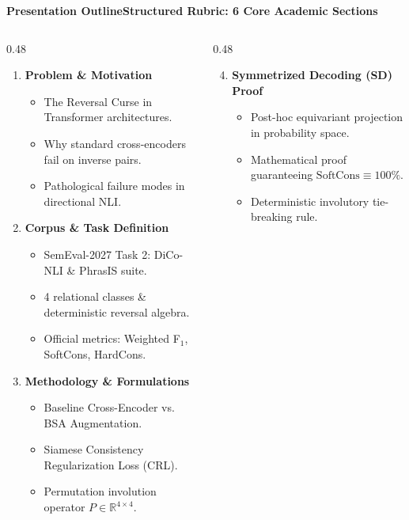 \documentclass[aspectratio=169,10pt]{beamer}
\begin{document}
\begin{frame}{\textbf{Presentation Outline}}{\textbf{Structured Rubric: 6 Core Academic Sections}}
  \begin{columns}[T]
    \begin{column}{0.48\textwidth}
      \begin{enumerate}
        \setlength{\itemsep}{6pt}
        \item \textbf{\color{UNAMNavy}Problem \& Motivation}
          \begin{itemize}\footnotesize\setlength{\itemsep}{1pt}
            \item The Reversal Curse in Transformer architectures.
            \item Why standard cross-encoders fail on inverse pairs.
            \item Pathological failure modes in directional NLI.
          \end{itemize}

        \item \textbf{\color{UNAMNavy}Corpus \& Task Definition}
          \begin{itemize}\footnotesize\setlength{\itemsep}{1pt}
            \item SemEval-2027 Task 2: DiCo-NLI \& PhrasIS suite.
            \item 4 relational classes \& deterministic reversal algebra.
            \item Official metrics: Weighted F$_1$, SoftCons, HardCons.
          \end{itemize}

        \item \textbf{\color{UNAMNavy}Methodology \& Formulations}
          \begin{itemize}\footnotesize\setlength{\itemsep}{1pt}
            \item Baseline Cross-Encoder vs. BSA Augmentation.
            \item Siamese Consistency Regularization Loss (CRL).
            \item Permutation involution operator $P \in \mathbb{R}^{4 \times 4}$.
          \end{itemize}
      \end{enumerate}
    \end{column}

    \begin{column}{0.48\textwidth}
      \begin{enumerate}
        \setcounter{enumi}{3}
        \setlength{\itemsep}{6pt}
        \item \textbf{\color{UNAMNavy}Symmetrized Decoding (SD) Proof}
          \begin{itemize}\footnotesize\setlength{\itemsep}{1pt}
            \item Post-hoc equivariant projection in probability space.
            \item Mathematical proof guaranteeing $\text{SoftCons} \equiv 100\%$.
            \item Deterministic involutory tie-breaking rule.
          \end{itemize}


\end{enumerate}
\end{column}
\end{columns}
\end{frame}
\end{document}
